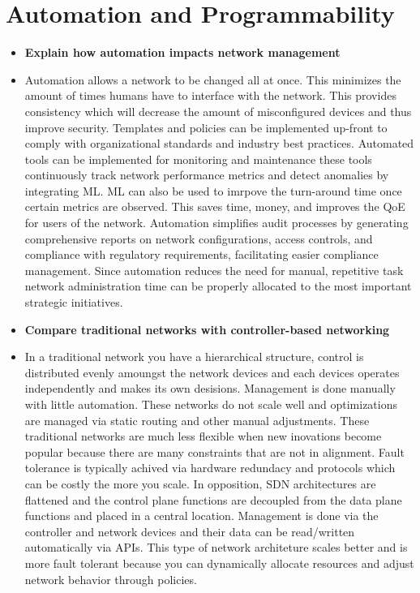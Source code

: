 \documentclass{article}
\begin{document}
\section{Automation and Programmability}
\begin{itemize}
  \item \textbf{Explain how automation impacts network management}
  	\item[] Automation allows a network to be changed all at once. This minimizes the amount of times humans have to interface with the network. This provides consistency which will decrease the amount of misconfigured devices and thus improve security. Templates and policies can be implemented up-front to comply with organizational standards and industry best practices. Automated tools can be implemented for monitoring and maintenance these tools continuously track network performance metrics and detect anomalies by integrating ML. ML can also be used to imrpove the turn-around time once certain metrics are observed. This saves time, money, and improves the QoE for users of the network. Automation simplifies audit processes by generating comprehensive reports on network configurations, access controls, and compliance with regulatory requirements, facilitating easier compliance management. Since automation reduces the need for manual, repetitive task network administration time can be properly allocated to the most important strategic initiatives.
  	  
  \item \textbf{Compare traditional networks with controller-based networking}
  	\item[] In a traditional network you have a hierarchical structure, control is distributed evenly amoungst the network devices and each devices operates independently and makes its own desisions. Management is done manually with little automation. These networks do not scale well and optimizations are managed via static routing and other manual adjustments. These traditional networks are much less flexible when new inovations become popular because there are many constraints that are not in alignment. Fault tolerance is typically achived via hardware redundacy and protocols which can be costly the more you scale. In opposition, SDN architectures are flattened and the control plane functions are decoupled from the data plane functions and placed in a central location. Management is done via the controller and network devices and their data can be read/written automatically via APIs. This type of network architeture scales better and is more fault tolerant because you can dynamically allocate resources and adjust network behavior through policies.  
  

\end{itemize}
\end{document}

